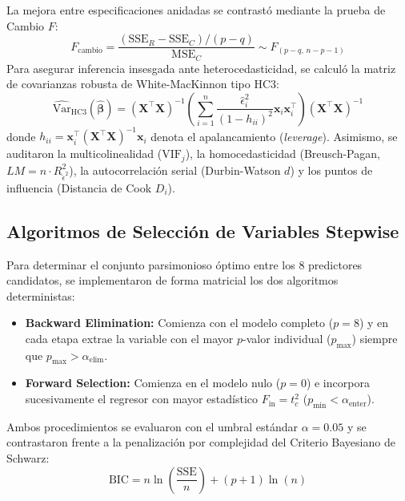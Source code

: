\documentclass[10pt,twocolumn,a4paper]{article}
\begin{document}
La mejora entre especificaciones anidadas se contrastó mediante la prueba de Cambio $F$:
\begin{equation}
    F_{\text{cambio}} = \frac{(\text{SSE}_R - \text{SSE}_C) / (p - q)}{\text{MSE}_C} \sim F_{(p - q, \, n - p - 1)}
\end{equation}
Para asegurar inferencia insesgada ante heterocedasticidad, se calculó la matriz de covarianzas robusta de White-MacKinnon tipo $\text{HC3}$:
\begin{equation}
    \widehat{\text{Var}}_{\text{HC3}}(\hat{\boldsymbol{\beta}}) = (\mathbf{X}^\top \mathbf{X})^{-1} \left( \sum_{i=1}^n \frac{\hat{\epsilon}_i^2}{(1 - h_{ii})^2} \mathbf{x}_i \mathbf{x}_i^\top \right) (\mathbf{X}^\top \mathbf{X})^{-1}
\end{equation}
donde $h_{ii} = \mathbf{x}_i^\top (\mathbf{X}^\top \mathbf{X})^{-1} \mathbf{x}_i$ denota el apalancamiento (\textit{leverage}). Asimismo, se auditaron la multicolinealidad ($\text{VIF}_j$), la homocedasticidad (Breusch-Pagan, $LM = n \cdot R^2_{\hat{\epsilon}^2}$), la autocorrelación serial (Durbin-Watson $d$) y los puntos de influencia (Distancia de Cook $D_i$).

\subsection{Algoritmos de Selección de Variables Stepwise}
Para determinar el conjunto parsimonioso óptimo entre los $8$ predictores candidatos, se implementaron de forma matricial los dos algoritmos deterministas:
\begin{itemize}
    \item \textbf{Backward Elimination:} Comienza con el modelo completo ($p=8$) y en cada etapa extrae la variable con el mayor $p$-valor individual ($p_{\max}$) siempre que $p_{\max} > \alpha_{\text{elim}}$.
    \item \textbf{Forward Selection:} Comienza en el modelo nulo ($p=0$) e incorpora sucesivamente el regresor con mayor estadístico $F_{\text{in}} = t_c^2$ ($p_{\min} < \alpha_{\text{enter}}$).
\end{itemize}
Ambos procedimientos se evaluaron con el umbral estándar $\alpha = 0.05$ y se contrastaron frente a la penalización por complejidad del Criterio Bayesiano de Schwarz:
\begin{equation}
    \text{BIC} = n \ln\left(\frac{\text{SSE}}{n}\right) + (p + 1)\ln(n)
\end{equation}

\end{document}
